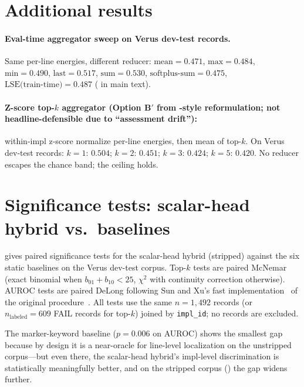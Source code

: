 \documentclass[10pt]{article}
\begin{document}
\section{Additional results}
\label{app:additional}

\paragraph{Eval-time aggregator sweep on Verus dev-test records.}
Same per-line energies, different reducer:
$\text{mean}{=}0.471$, $\text{max}{=}0.484$, $\text{min}{=}0.490$,
$\text{last}{=}0.517$, $\text{sum}{=}0.530$, $\text{softplus-sum}{=}0.475$,
$\text{LSE(train-time)}{=}0.487$ ( in main text).

\paragraph{Z-score top-$k$ aggregator (Option B$'$ from
\cite{lecun2006tutorial}-style reformulation; not headline-defensible due to
``assessment drift''):}
within-impl z-score normalize per-line energies, then mean of top-$k$.
On Verus dev-test records: $k{=}1$: $0.504$; $k{=}2$: $0.451$; $k{=}3$: $0.424$;
$k{=}5$: $0.420$. No reducer escapes the chance band; the ceiling holds.

\section{Significance tests: scalar-head hybrid vs.\ baselines}
\label{app:significance}

 gives paired significance tests for the scalar-head hybrid
(stripped) against the six static baselines on the Verus dev-test corpus. Top-$k$
tests are paired McNemar (exact binomial when $b_{01}+b_{10}<25$, $\chi^2$
with continuity correction otherwise). AUROC tests are paired DeLong
following Sun and Xu's fast implementation~\cite{sun2014fastdelong} of
the original procedure~\cite{delong1988comparing}. All tests use the same
$n=1{,}492$ records (or $n_{\text{labeled}}=609$ FAIL records for top-$k$)
joined by \texttt{impl\_id}; no records are excluded.



The marker-keyword baseline ($p=0.006$ on AUROC) shows the smallest gap
because by design it is a near-oracle for line-level localization on the
unstripped corpus---but even there, the scalar-head hybrid's impl-level discrimination
is statistically meaningfully better, and on the stripped corpus
() the gap widens further.
\end{document}
